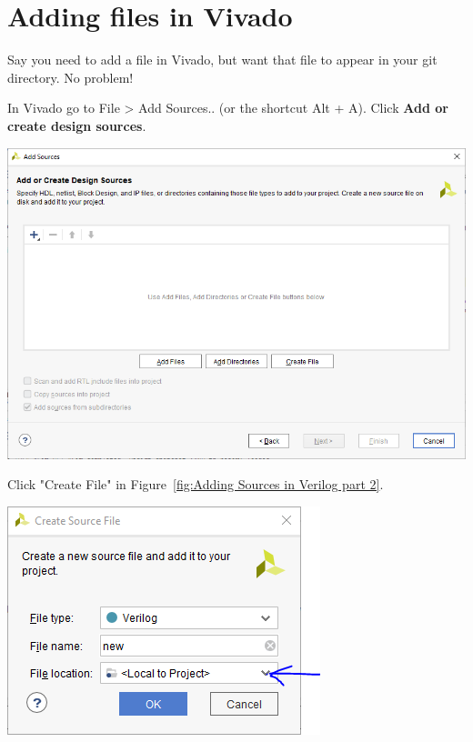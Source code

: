 \documentclass[12pt]{article}
\begin{document}
\section{Adding files in Vivado}
Say you need to add a file in Vivado, but want that file to appear in your git directory. No problem!

In Vivado go to File > Add Sources.. (or the shortcut Alt + A). Click \textbf{Add or create design sources}. 

\begin{center}
    \includegraphics[scale=0.5]{viv_11.PNG}
    \label{fig:Adding Sources in Verilog part 2}
\end{center}

Click "Create File" in Figure~\ref{fig:Adding Sources in Verilog part 2}.

\begin{center}
    \includegraphics[scale=0.8]{viv_12.PNG}
    \label{fig:Create Source File Screen}
\end{center}
\end{document}
